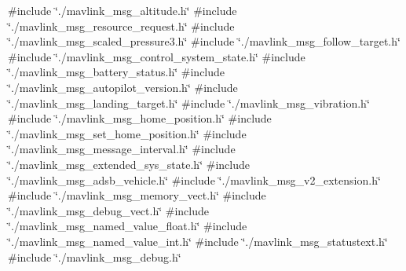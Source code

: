 {\ttfamily \#include \char`\"{}./mavlink\+\_\+msg\+\_\+altitude.\+h\char`\"{}}\newline
{\ttfamily \#include \char`\"{}./mavlink\+\_\+msg\+\_\+resource\+\_\+request.\+h\char`\"{}}\newline
{\ttfamily \#include \char`\"{}./mavlink\+\_\+msg\+\_\+scaled\+\_\+pressure3.\+h\char`\"{}}\newline
{\ttfamily \#include \char`\"{}./mavlink\+\_\+msg\+\_\+follow\+\_\+target.\+h\char`\"{}}\newline
{\ttfamily \#include \char`\"{}./mavlink\+\_\+msg\+\_\+control\+\_\+system\+\_\+state.\+h\char`\"{}}\newline
{\ttfamily \#include \char`\"{}./mavlink\+\_\+msg\+\_\+battery\+\_\+status.\+h\char`\"{}}\newline
{\ttfamily \#include \char`\"{}./mavlink\+\_\+msg\+\_\+autopilot\+\_\+version.\+h\char`\"{}}\newline
{\ttfamily \#include \char`\"{}./mavlink\+\_\+msg\+\_\+landing\+\_\+target.\+h\char`\"{}}\newline
{\ttfamily \#include \char`\"{}./mavlink\+\_\+msg\+\_\+vibration.\+h\char`\"{}}\newline
{\ttfamily \#include \char`\"{}./mavlink\+\_\+msg\+\_\+home\+\_\+position.\+h\char`\"{}}\newline
{\ttfamily \#include \char`\"{}./mavlink\+\_\+msg\+\_\+set\+\_\+home\+\_\+position.\+h\char`\"{}}\newline
{\ttfamily \#include \char`\"{}./mavlink\+\_\+msg\+\_\+message\+\_\+interval.\+h\char`\"{}}\newline
{\ttfamily \#include \char`\"{}./mavlink\+\_\+msg\+\_\+extended\+\_\+sys\+\_\+state.\+h\char`\"{}}\newline
{\ttfamily \#include \char`\"{}./mavlink\+\_\+msg\+\_\+adsb\+\_\+vehicle.\+h\char`\"{}}\newline
{\ttfamily \#include \char`\"{}./mavlink\+\_\+msg\+\_\+v2\+\_\+extension.\+h\char`\"{}}\newline
{\ttfamily \#include \char`\"{}./mavlink\+\_\+msg\+\_\+memory\+\_\+vect.\+h\char`\"{}}\newline
{\ttfamily \#include \char`\"{}./mavlink\+\_\+msg\+\_\+debug\+\_\+vect.\+h\char`\"{}}\newline
{\ttfamily \#include \char`\"{}./mavlink\+\_\+msg\+\_\+named\+\_\+value\+\_\+float.\+h\char`\"{}}\newline
{\ttfamily \#include \char`\"{}./mavlink\+\_\+msg\+\_\+named\+\_\+value\+\_\+int.\+h\char`\"{}}\newline
{\ttfamily \#include \char`\"{}./mavlink\+\_\+msg\+\_\+statustext.\+h\char`\"{}}\newline
{\ttfamily \#include \char`\"{}./mavlink\+\_\+msg\+\_\+debug.\+h\char`\"{}}\newline

